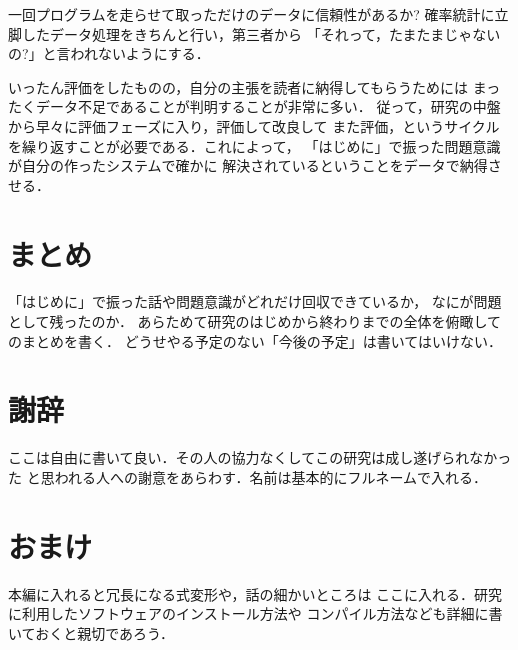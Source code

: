 \documentclass{eithesis}
\begin{document}
一回プログラムを走らせて取っただけのデータに信頼性があるか?
確率統計に立脚したデータ処理をきちんと行い，第三者から
「それって，たまたまじゃないの?」と言われないようにする．

いったん評価をしたものの，自分の主張を読者に納得してもらうためには
まったくデータ不足であることが判明することが非常に多い．
従って，研究の中盤から早々に評価フェーズに入り，評価して改良して
また評価，というサイクルを繰り返すことが必要である．これによって，
「はじめに」で振った問題意識が自分の作ったシステムで確かに
解決されているということをデータで納得させる．


\chapter{まとめ}
「はじめに」で振った話や問題意識がどれだけ回収できているか，
なにが問題として残ったのか．
あらためて研究のはじめから終わりまでの全体を俯瞰してのまとめを書く．
どうせやる予定のない「今後の予定」は書いてはいけない．


\chapter*{謝辞}
ここは自由に書いて良い．その人の協力なくしてこの研究は成し遂げられなかった
と思われる人への謝意をあらわす．名前は基本的にフルネームで入れる．

\begin{thebibliography}{99}
\end{thebibliography}

\appendix
\chapter{おまけ}
本編に入れると冗長になる式変形や，話の細かいところは
ここに入れる．研究に利用したソフトウェアのインストール方法や
コンパイル方法なども詳細に書いておくと親切であろう．
\end{document}
